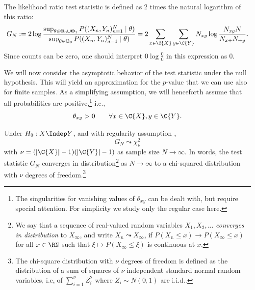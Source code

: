 The likelihood ratio test statistic is defined as 2 times the natural logarithm of this ratio:
\begin{equation}\label{eq:G_test_statistic}
  G_N := 2 \log \frac{\sup_{\theta\in\Theta_0\cup\Theta_1} P((X_n,Y_n)_{n=1}^N \mid \theta)}{\sup_{\theta\in\Theta_0} P((X_n,Y_n)_{n=1}^N \mid \theta)} = 2 \sum_{x\in\C{X}} \sum_{y\in\C{Y}} N_{xy} \log \frac{N_{xy} N}{N_{x+} N_{+ y}}.
\end{equation}
Since counts can be zero, one should interpret $0 \log \frac{0}{0}$ in this expression as $0$.

We will now consider the asymptotic behavior of the test statistic under the null hypothesis.
This will yield an approximation for the $p$-value that we can use also for finite samples.
As a simplifying assumption, we will henceforth assume that all probabilities are positive,\footnote{The singularities for vanishing values of $\theta_{xy}$ can be dealt with, but require special attention. For simplicity we study only the regular case here.} i.e.,
\begin{equation}\label{eq:G_test_regularity}
  \theta_{xy} > 0 \qquad \forall x \in \C{X}, y\in \C{Y}.
\end{equation}
\begin{Prp}\label{prp:G_test_asymptotics_H0}
Under $H_0 : X \Indep Y$, and with regularity assumption ,
$$G_N \leadsto \chi_\nu^2$$
with $\nu = (|\C{X}| - 1)(|\C{Y}| - 1)$ as sample size $N \to \infty$.
  In words, the test statistic $G_N$ converges in distribution\footnote{We say that a sequence of real-valued random variables $X_1,X_2,\dots$ \emph{converges in distribution} to $X_\infty$, and write $X_n \leadsto X_\infty$, if $P(X_n \le x) \to P(X_\infty \le x)$ for all $x \in \RN$ such that $\xi \mapsto P(X_\infty \le \xi)$ is continuous at $x$.} as $N \to \infty$ to a chi-squared distribution with $\nu$ degrees of freedom.\footnote{The chi-square distribution with $\nu$ degrees of freedom is defined as the distribution of a sum of squares of $\nu$ independent standard normal random variables, i.e, of $\sum_{i=1}^\nu Z_i^2$ where $Z_i \sim N(0,1)$ are i.i.d..}
\end{Prp}
